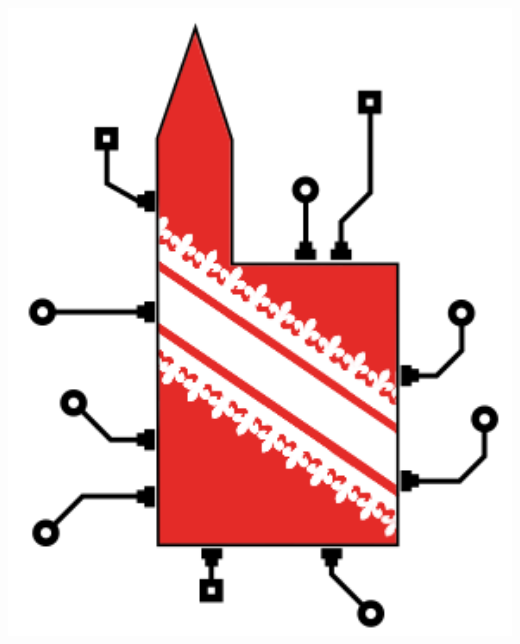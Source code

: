 \documentclass[a0,portrait]{a0poster}
\begin{document}
\begin{minipage}[b]{0.25\linewidth}
\includegraphics[width=15cm]{JNRDM.png}\\


\end{minipage}

\vspace{1cm} %

\end{document}

